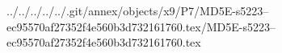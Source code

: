 ../../../../../.git/annex/objects/x9/P7/MD5E-s5223--ec95570af27352f4e560b3d732161760.tex/MD5E-s5223--ec95570af27352f4e560b3d732161760.tex